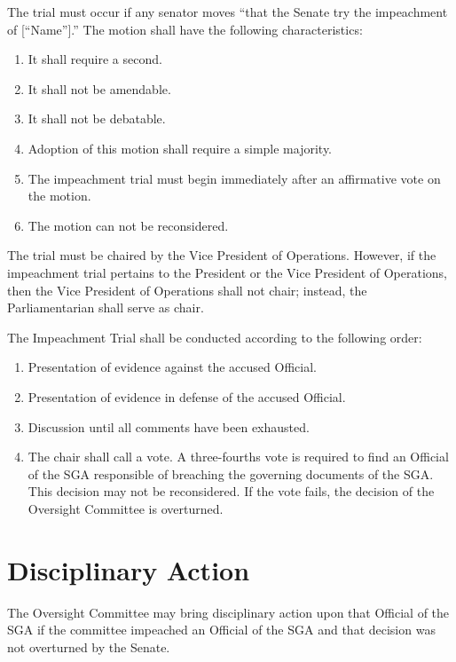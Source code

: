 \documentclass[12pt]{scrreprt}
\begin{document}
The trial must occur if any senator moves “that the Senate try the impeachment of [“Name”].” The motion
shall have the following characteristics:
\begin{enumerate}
    \item It shall require a second.
    \item It shall not be amendable.
    \item It shall not be debatable.
    \item Adoption of this motion shall require a simple majority.
    \item The impeachment trial must begin immediately after an affirmative vote on the motion.
    \item The motion can not be reconsidered.
\end{enumerate}

The trial must be chaired by the Vice President of Operations. However, if the impeachment trial pertains
to the President or the Vice President of Operations, then the Vice President of Operations shall not chair;
instead, the Parliamentarian shall serve as chair.

The Impeachment Trial shall be conducted according to the following order:
\begin{enumerate}
    \item Presentation of evidence against the accused Official.
    \item Presentation of evidence in defense of the accused Official.
    \item Discussion until all comments have been exhausted.
    \item The chair shall call a vote. A three-fourths vote is required to find an Official of the SGA
responsible of breaching the governing documents of the SGA. This decision may not be
reconsidered. If the vote fails, the decision of the Oversight Committee is overturned.
\end{enumerate}

\section{Disciplinary Action} \label{sec:disciplinary_action}
 The Oversight Committee may bring disciplinary action upon that Official of the SGA if the committee
impeached an Official of the SGA and that decision was not overturned by the Senate.
\end{document}

